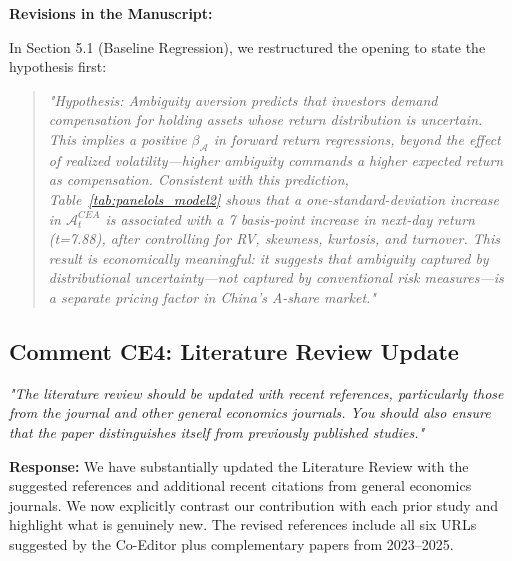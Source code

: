 \documentclass[12pt]{article}
\begin{document}
\begin{highlightbox}
\textbf{Revisions in the Manuscript:}

In Section 5.1 (Baseline Regression), we restructured the opening to state the hypothesis first:
\vspace{0.2cm}
\begin{quote}
\itshape "Hypothesis: Ambiguity aversion predicts that investors demand compensation for holding assets whose return distribution is uncertain. This implies a positive $\beta_{\mathcal{A}}$ in forward return regressions, beyond the effect of realized volatility---higher ambiguity commands a higher expected return as compensation. Consistent with this prediction, Table~\ref{tab:panelols_model2} shows that a one-standard-deviation increase in $\mathcal{A}^{CEA}_t$ is associated with a 7 basis-point increase in next-day return (t=7.88), after controlling for RV, skewness, kurtosis, and turnover. This result is economically meaningful: it suggests that ambiguity captured by distributional uncertainty---not captured by conventional risk measures---is a separate pricing factor in China's A-share market."
\end{quote}
\end{highlightbox}

\subsection*{Comment CE4: Literature Review Update}
\textit{"The literature review should be updated with recent references, particularly those from the journal and other general economics journals. You should also ensure that the paper distinguishes itself from previously published studies."}

\begin{highlightbox}
\textbf{Response:} We have substantially updated the Literature Review with the suggested references and additional recent citations from general economics journals. We now explicitly contrast our contribution with each prior study and highlight what is genuinely new. The revised references include all six URLs suggested by the Co-Editor plus complementary papers from 2023--2025.
\end{highlightbox}
\end{document}
